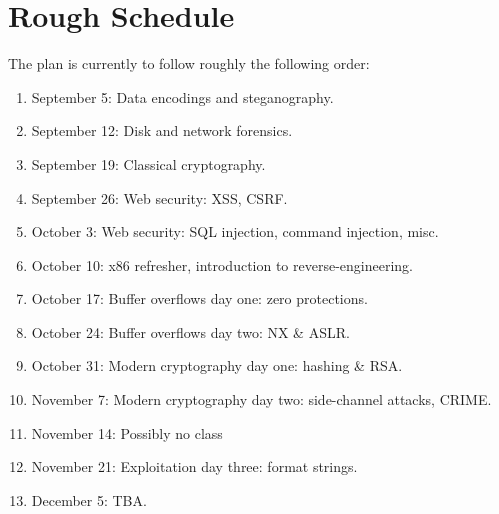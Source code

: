 \documentclass{article}
\begin{document}
\section{Rough Schedule}
The plan is currently to follow roughly the following order:
\begin{enumerate}
\item September 5: Data encodings and steganography.
\item September 12: Disk and network forensics.
\item September 19: Classical cryptography.
\item September 26: Web security: XSS, CSRF.
\item October 3: Web security: SQL injection, command injection, misc.
\item October 10: x86 refresher, introduction to reverse-engineering.
\item October 17: Buffer overflows day one: zero protections.
\item October 24: Buffer overflows day two: NX \& ASLR.
\item October 31: Modern cryptography day one: hashing \& RSA.
\item November 7: Modern cryptography day two: side-channel attacks, CRIME.
\item November 14: Possibly no class
\item November 21: Exploitation day three: format strings.
\item December 5: TBA.
\end{enumerate}
\end{document}
